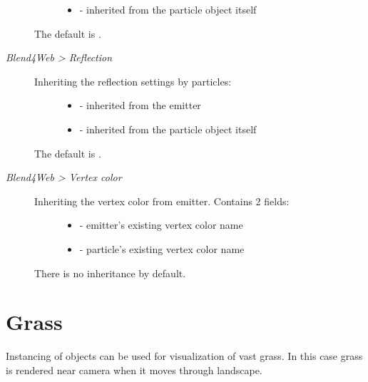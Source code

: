 \documentclass[a4paper,12pt,oneside]{sphinxmanual}
\begin{document}
\begin{description}
\begin{description}
\begin{itemize}
\item {} 
 - inherited from the particle object itself

\end{itemize}

\end{description}

The default is .

\item[{\emph{Blend4Web \textgreater{} Reflection}}] \leavevmode\begin{description}
\item[{Inheriting the reflection settings by particles:}] \leavevmode\begin{itemize}
\item {} 
 - inherited from the emitter

\item {} 
 - inherited from the particle object itself

\end{itemize}

\end{description}

The default is .

\item[{\emph{Blend4Web \textgreater{} Vertex color}}] \leavevmode\begin{description}
\item[{Inheriting the vertex color from emitter. Contains 2 fields:}] \leavevmode\begin{itemize}
\item {} 
 - emitter's existing vertex color name

\item {} 
 - particle's existing vertex color name

\end{itemize}

\end{description}

There is no inheritance by default.

\end{description}


\section{Grass}
\label{particles_instancing:id3}\label{particles_instancing:particles-grass}
Instancing of objects can be used for visualization of vast grass. In this case grass is rendered near camera when it moves through landscape.
\end{document}
